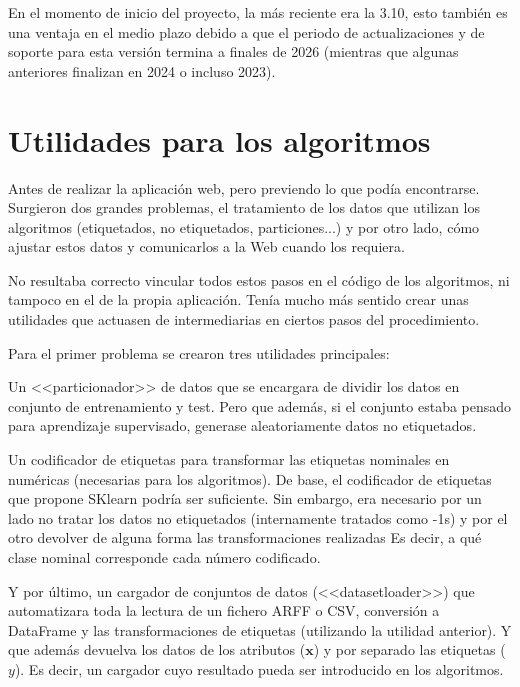 En el momento de inicio del proyecto, la más reciente era la 3.10, esto también
es una ventaja en el medio plazo debido a que el periodo de actualizaciones y de
soporte para esta versión termina a finales de 2026 (mientras que algunas
anteriores finalizan en 2024 o incluso 2023).

\section{Utilidades para los algoritmos}

Antes de realizar la aplicación web, pero previendo lo que podía encontrarse.
Surgieron dos grandes problemas, el tratamiento de los datos que utilizan los
algoritmos (etiquetados, no etiquetados, particiones...) y por otro lado, cómo
ajustar estos datos y comunicarlos a la Web cuando los requiera.

No resultaba correcto vincular todos estos pasos en el código de los algoritmos,
ni tampoco en el de la propia aplicación. Tenía mucho más sentido crear unas
utilidades que actuasen de intermediarias en ciertos pasos del procedimiento.

Para el primer problema se crearon tres utilidades principales: 

Un <<particionador>> de datos que se encargara de dividir los datos en conjunto
de entrenamiento y test. Pero que además, si el conjunto estaba pensado para
aprendizaje supervisado, generase aleatoriamente datos no etiquetados.

Un codificador de etiquetas para transformar las etiquetas nominales en
numéricas (necesarias para los algoritmos). De base, el codificador de etiquetas
que propone SKlearn podría ser suficiente. Sin embargo, era necesario por un
lado no tratar los datos no etiquetados (internamente tratados como -1s) y por
el otro devolver de alguna forma las transformaciones realizadas Es decir, a qué
clase nominal corresponde cada número codificado.

Y por último, un cargador de conjuntos de datos (<<datasetloader>>) que
automatizara toda la lectura de un fichero ARFF o CSV, conversión a DataFrame y
las transformaciones de etiquetas (utilizando la utilidad anterior). Y que
además devuelva los datos de los atributos ($\mathbf{x}$) y por separado las
etiquetas ($y$). Es decir, un cargador cuyo resultado pueda ser introducido en los
algoritmos. 

